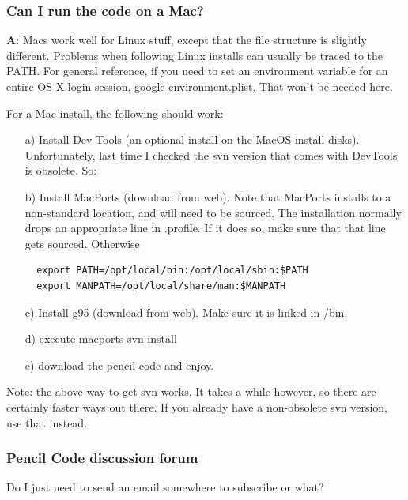 \documentclass[\mydriver,12pt,twoside,notitlepage,a4paper]{article}
\begin{document}
\subsubsection{Can I run the code on a Mac?}

\medskip

{\bf A}: Macs work well for Linux stuff, except that the file structure is
slightly different. Problems when following Linux installs can usually be
traced to the PATH. For general reference, if you need to set an environment
variable for an entire OS-X login session, google environment.plist. That won't
be needed here.

For a Mac install, the following should work:

\begin{itemize}
\item[a)]
Install Dev Tools (an optional install on the MacOS install disks).
Unfortunately, last time I checked the svn version that comes with DevTools
is obsolete. So:
\item[b)]
Install MacPorts (download from web). Note that MacPorts installs to a
non-standard location, and will need to be sourced. The installation
normally drops an appropriate line in .profile. If it does so, make sure
that that line gets sourced. Otherwise

\begin{Verbatim}
  export PATH=/opt/local/bin:/opt/local/sbin:$PATH
  export MANPATH=/opt/local/share/man:$MANPATH
\end{Verbatim}

\item[c)]
Install g95 (download from web). Make sure it is linked in /bin.
\item[d)]
execute macports svn install
\item[e)]
download the pencil-code and enjoy.
\end{itemize}

Note: the above way to get svn works. It takes a while however, so there
are certainly faster ways out there. If you already have a non-obsolete svn
version, use that instead.

\subsubsection{Pencil Code discussion forum}

Do I just need to send an email somewhere to subscribe or what?

\medskip
\end{document}
